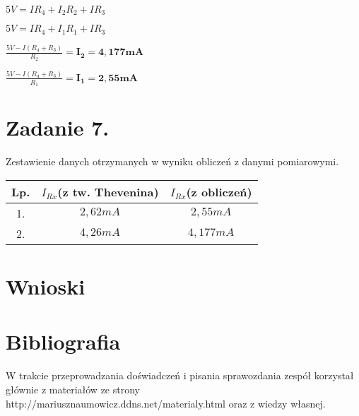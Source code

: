 \documentclass[polish,a4paper]{article}
\begin{document}
$5V = IR_4 + I_2R_2 + IR_3$
\bigbreak

$5V = IR_4 + I_1R_1 + IR_3$
\bigbreak
\bigbreak

$\frac{5V - I(R_4 + R_3)}{R_2} = \bm{I_2 = 4,177mA}$
\bigbreak

$\frac{5V - I(R_4 + R_3)}{R_1} = \bm{I_1 = 2,55mA}$

\section{Zadanie 7.}
Zestawienie danych otrzymanych w wyniku obliczeń z danymi pomiarowymi.

\begin{center}
\begin{tabular}{|c|c|c|}
\hline
\textbf{Lp.} & \textbf{$I_{Rx}$(z tw. Thevenina)} & \textbf{$I_{Rx}$(z obliczeń)}\\
\hline
1. & $2,62mA$ & $2,55mA$\\
\hline %
2. & $4,26mA$ & $4,177mA$\\
\hline
\end{tabular}
\end{center}

\section{Wnioski}


\section*{Bibliografia}
W trakcie przeprowadzania doświadczeń i pisania sprawozdania zespół korzystał głównie z materiałów ze strony http://mariusznaumowicz.ddns.net/materialy.html oraz z wiedzy własnej.



\end{document}
